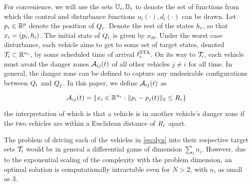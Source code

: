 For convenience, we will use the sets $\mathbb{U}_i, \mathbb{D}_i$ to denote the set of functions from which the control and disturbance functions $u_i(\cdot), d_i(\cdot)$ can be drawn. %
Let $p_i \in \mathbb{R}^p$ denote the position of $Q_i$. %
Denote the rest of the states $h_i$, so that $x_i = (p_i, h_i)$. The initial state of $Q_i$ is given by $x_{i0}$. Under the worst case disturbance, each vehicle aims to get to some set of target states, denoted $\mathcal{T}_i \subset \mathbb{R}^{n_i}$, by some scheduled time of arrival $t^\text{STA}_i$. On its way to $\mathcal{T}_i$, each vehicle must avoid the danger zones $\mathcal{A}_{ij}(t)$ of all other vehicles $j\neq i$ for all time. In general, the danger zone can be defined to capture any undesirable configurations between $Q_i$ and $Q_j$. In this paper, we define $\mathcal{A}_{ij}(t)$ as

\vspace{-0.5em} 
\begin{equation}
\mathcal{A}_{ij}(t) = \{x_i \in \mathbb{R}^{n_i}: \|p_i - p_j(t)\|_2 \le R_c \}
\end{equation}

\noindent the interpretation of which is that a vehicle is in another vehicle's danger zone if the two vehicles are within a Euclidean distance of $R_c$ apart. %
 
The problem of driving each of the vehicles in \eqref{eq:dyn} into their respective target sets $\mathcal{T}_i$ would be in general a differential game of dimension $\sum_i n_i$. However, due to the exponential scaling of the complexity with the problem dimension, an optimal solution is computationally intractable even for $N>2$, with $n_i$ as small as $3$.

